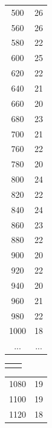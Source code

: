 \begin{table}
\begin{tabular}{c|c}
500	&26\\ 

560	&26\\ 

580	&22\\ 
	
600	&25\\ 

620	&22\\ 

640	&21\\ 

660	&20\\ 

680	&23\\ 

700	&21\\ 

760	&22\\ 

780	&20\\ 

800	&24\\ 

820	&22\\ 

840	&24\\ 

860	&23\\ 

880	&22\\ 

900	&20\\ 

920	&22\\ 

940	&20\\ 

960	&21\\ 

980	&22\\ 

1000&	18\\ 
...&...\\
\end{tabular}
\begin{tabular}{c|c}
              &           \\
\end{tabular}
\begin{tabular}{c|c}

1080&	19\\ 
	
1100&	19\\ 

1120&	18\\ 


\end{tabular}
\end{table}
